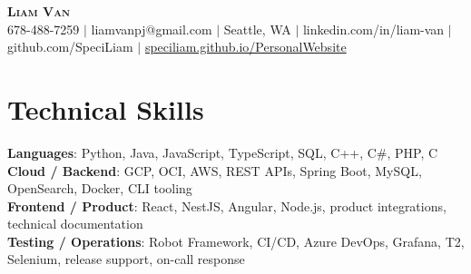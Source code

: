 \documentclass[letterpaper,11pt]{article}
\begin{document}

%
\begin{center}
    \textbf{\Huge \scshape Liam Van} \\ \vspace{1pt}
    \small 678-488-7259 $|$ \small {liamvanpj@gmail.com} $|$ Seattle, WA
 {{$|$ linkedin.com/in/liam-van} {$|$ github.com/SpeciLiam} {$|$ \href{https://speciliam.github.io/PersonalWebsite}{speciliam.github.io/PersonalWebsite}}}

\end{center}

\section{Technical Skills}
 \begin{itemize}[leftmargin=0.15in, label={}]
    \small{\item{
     \textbf{Languages}{: Python, Java, JavaScript, TypeScript, SQL, C++, C\#, PHP, C} \\
     \textbf{Cloud / Backend}{: GCP, OCI, AWS, REST APIs, Spring Boot, MySQL, OpenSearch, Docker, CLI tooling} \\
     \textbf{Frontend / Product}{: React, NestJS, Angular, Node.js, product integrations, technical documentation} \\
     \textbf{Testing / Operations}{: Robot Framework, CI/CD, Azure DevOps, Grafana, T2, Selenium, release support, on-call response} \\
    }}
 \end{itemize}
%
\end{document}
